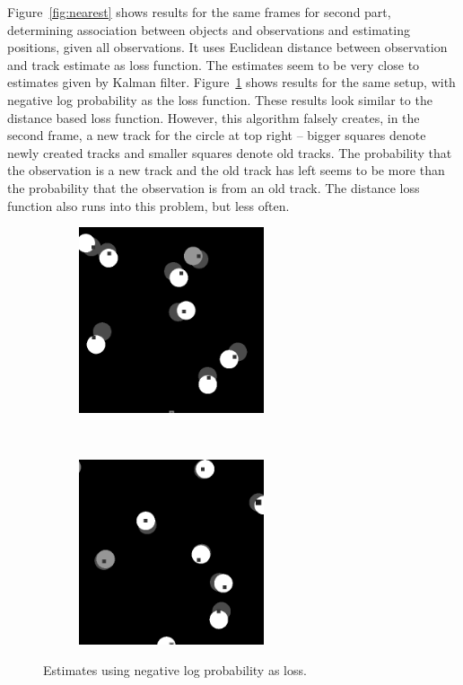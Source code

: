 \documentclass[a4paper]{article}
\begin{document}
Figure~\ref{fig:nearest} shows results for the same frames for second part,
determining association between objects and observations and estimating
positions, given all observations.
It uses Euclidean distance between observation and track estimate as loss function.
The estimates seem to be very close to estimates given by Kalman filter.
Figure~\ref{fig:unoccluded_ml} shows results for the same setup, with
negative log probability as the loss function. These results look similar
to the distance based loss function.
However, this algorithm falsely creates, in the second frame, a new track for
the circle at top right -- bigger squares denote newly created tracks and
smaller squares denote old tracks.
The probability that the observation is a new track and the old track has left
seems to be more than the probability that the observation is from an old track.
The distance loss function also runs into this problem, but less often.
\begin{figure}[h]
  \centering
  \begin{subfigure}{0.48\textwidth}
  \centering
  \includegraphics[width=0.6\textwidth]{images/unoccluded_ml_1.png}
  \end{subfigure}~
  \begin{subfigure}{0.48\textwidth}
  \centering
  \includegraphics[width=0.6\textwidth]{images/unoccluded_ml_2.png}
  \end{subfigure}
  \caption{Estimates using negative log probability as loss.}
  \label{fig:unoccluded_ml}
  \vspace{-2pt}
\end{figure}
\end{document}
